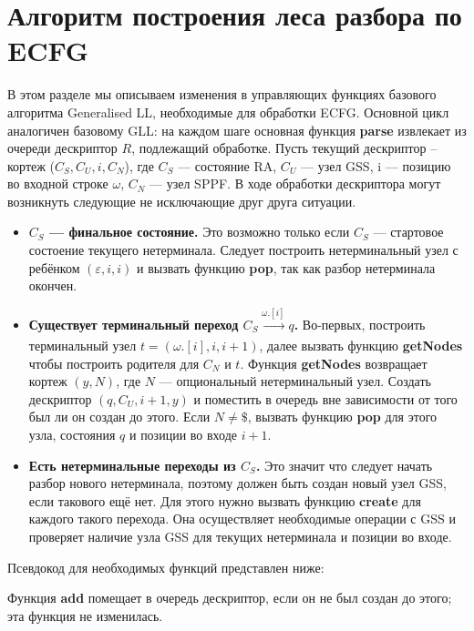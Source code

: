 \documentclass[14pt]{matmex-diploma-custom}
\begin{document}
	\section{Алгоритм построения леса разбора по ECFG}
	В этом разделе мы описываем изменения в управляющих функциях базового алгоритма 
	Generalised LL, необходимые для обработки ECFG. Основной цикл аналогичен базовому
	GLL: на каждом шаге основная функция \textbf{parse} извлекает из очереди дескриптор
	$R$, подлежащий обработке. Пусть текущий дескриптор -- кортеж ($C_S, C_U, i, C_N$),
	где $C_S$ --- состояние RA, $C_U$ --- узел GSS, i --- позицию во входной строке 
	$\omega$, $C_N$ --- узел SPPF. В ходе обработки дескриптора могут возникнуть следующие
	не исключающие друг друга ситуации.
	\begin{itemize} 
		\item \textbf{$C_S$ --- финальное состояние.} Это возможно только если $C_S$
		--- стартовое состоение текущего нетерминала. Следует построить нетерминальный
		узел с ребёнком $(\varepsilon, i, i)$ и вызвать функцию \textbf{pop}, так как
		разбор нетерминала окончен.
		
		\item \textbf{Существует терминальный переход $C_S \xrightarrow[]{\omega.[i]} q$.}
		Во-первых, построить терминальный узел $ t = (\omega.[i], i, i+1) $, далее 
		вызвать функцию \textbf{getNodes} чтобы построить родителя для $ C_N $ и $ t $. 
		Функция \textbf{getNodes} возвращает кортеж $ (y, N) $, где $N$ --- опциональный
		нетерминальный узел. Создать дескриптор $ (q, C_U, i+1, y) $ и поместить в 
		очередь вне зависимости от того был ли он создан до этого. Если $ N \neq \$$,
		вызвать функцию \textbf{pop} для этого узла, состояния $ q $ и позиции во
		входе $ i + 1 $.
		
		\item\textbf{ Есть нетерминальные переходы из $C_S$.}
		Это значит что следует начать разбор нового нетерминала, поэтому должен быть
		создан новый узел GSS, если такового ещё нет. Для этого нужно вызвать функцию
		\textbf{create} для каждого такого перехода. Она осуществляет необходимые
		операции с GSS и проверяет наличие узла GSS для текущих нетерминала и 
		позиции во входе.
	\end{itemize}
	
	Псевдокод для необходимых функций представлен ниже:
	
	Функция \textbf{add} помещает в очередь дескриптор, если он не был создан до этого; эта функция не изменилась.
	
	
\end{document}
